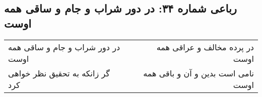 \begin{center}
\section*{رباعی شماره ۳۴: در دور شراب و جام و ساقی همه اوست}
\label{sec:034}
\begin{longtable}{l p{0.5cm} r}
در دور شراب و جام و ساقی همه اوست
&&
در پرده مخالف و عراقی همه اوست
\\
گر زانکه به تحقیق نظر خواهی کرد
&&
نامی است بدین و آن و باقی همه اوست
\\
\end{longtable}
\end{center}
